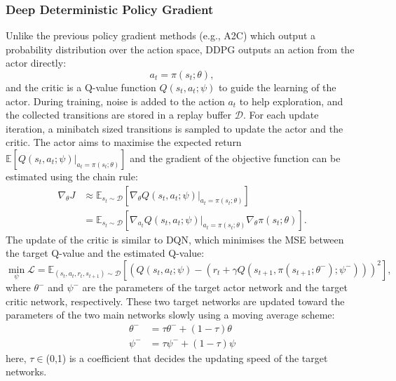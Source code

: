\subsubsection{Deep Deterministic Policy Gradient}
Unlike the previous policy gradient methods (e.g., A2C) which output a probability distribution over the action space, DDPG outputs an action from the actor directly:
\begin{equation}
    a_{t} = \pi(s_{t}; \theta),
\end{equation}
and the critic is a Q-value function $Q(s_{t}, a_{t};\psi)$ to guide the learning of the actor. During training, noise is added to the action $a_{t}$ to help exploration, and the collected transitions are stored in a replay buffer $\mathcal{D}$. For each update iteration, a minibatch sized transitions is sampled to update the actor and the critic. The actor aims to maximise the expected return $\mathbb{E}[Q(s_{t}, a_{t};\psi)|_{a_{t}=\pi(s_{t};\theta)}]$ and the gradient of the objective function can be estimated using the chain rule:
\begin{align}
    \nabla_{\theta}J &\approx\mathbb{E}_{s_{t}\sim\mathcal{D}}[\nabla_{\theta}Q(s_{t}, a_{t};\psi)|_{a_{t}=\pi(s_{t};\theta)}]\\
    & = \mathbb{E}_{s_{t}\sim\mathcal{D}}[\nabla_{a_{t}}Q(s_{t}, a_{t};\psi)|_{a_{t}=\pi(s_{t};\theta)} \nabla_{\theta}\pi(s_{t};\theta)].
\end{align}
The update of the critic is similar to DQN, which minimises the MSE between the target Q-value and the estimated Q-value:
\begin{equation}
    \min_{\psi}\mathcal{L} = \mathbb{E}_{(s_{t}, a_{t}, r_{t}, s_{t+1})\sim\mathcal{D}}[(Q(s_{t}, a_{t};\psi) - (r_{t} + \gamma Q(s_{t+1}, \pi(s_{t+1};\theta^{-});\psi^{-})))^{2}],
\end{equation}
where $\theta^{-}$ and $\psi^{-}$ are the parameters of the target actor network and the target critic network, respectively. These two target networks are updated toward the parameters of the two main networks slowly using a moving average scheme:
\begin{align}
    \theta^{-} &= \tau\theta^{-} + (1-\tau)\theta\\
    \psi^{-} &= \tau\psi^{-} + (1-\tau)\psi
\end{align}
here, $\tau\in$(0,1) is a coefficient that decides the updating speed of the target networks. 
\newpage

